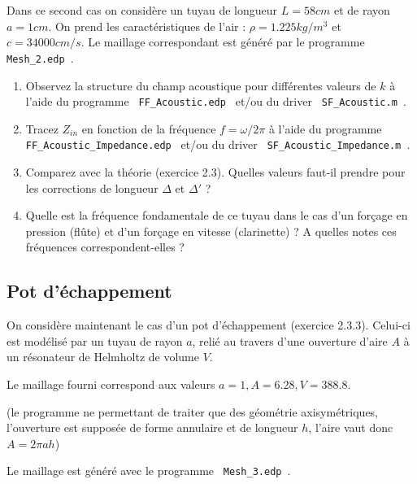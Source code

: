 \documentclass[11pt,a4paper]{article}
\begin{document}
Dans ce second cas on considère un tuyau de longueur $L = 58cm$ et de rayon $a =1cm$. 
On prend les caractéristiques de l'air : $\rho = 1.225 kg/m^3$ et $c = 34000 cm/s$. 
Le maillage correspondant est généré par le programme \verb| Mesh_2.edp |.

\begin{enumerate}
\item
Observez la structure du champ acoustique pour différentes valeurs de $k$ à l'aide du programme \verb| FF_Acoustic.edp | et/ou du driver \verb| SF_Acoustic.m |.

\item 
Tracez $Z_{in}$ en fonction de la fréquence $f = \omega/2\pi$ à l'aide du programme 
\verb| FF_Acoustic_Impedance.edp | et/ou du driver \verb| SF_Acoustic_Impedance.m |.

\item Comparez avec la théorie (exercice 2.3). Quelles valeurs faut-il prendre pour les corrections de longueur $\Delta$ et $\Delta'$ ?

\item Quelle est la fréquence fondamentale de ce tuyau dans le cas d'un forçage en pression (flûte) et d'un forçage en vitesse (clarinette) ? A quelles notes ces fréquences correspondent-elles ? 

\end{enumerate}

\subsection{Pot d'échappement}

On considère maintenant le cas d'un pot d'échappement (exercice 2.3.3).
Celui-ci est modélisé par un tuyau de rayon $a$, relié au travers d'une
ouverture d'aire $A$ à un résonateur de Helmholtz de volume $V$. 

Le maillage fourni correspond aux valeurs $a=1,A=6.28,V=388.8$.

(le programme ne permettant de traiter que des géométrie axisymétriques, l'ouverture est supposée de forme annulaire et de longueur $h$, l'aire vaut donc $A = 2\pi a h$)

Le maillage est généré avec le programme \verb| Mesh_3.edp |.
\end{document}
